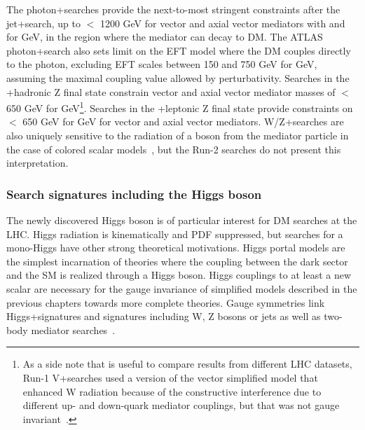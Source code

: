 The photon+\MET searches provide the next-to-most stringent constraints after the jet+\MET search, 
up to \mmed $<$ 1200 GeV for vector and axial vector mediators with  and  for  GeV,
in the region where the mediator can decay to DM. %
The ATLAS photon+\MET search also sets limit on the EFT model where the DM couples directly to the photon, 
excluding EFT scales between 150 and 750 GeV for  GeV, assuming the maximal coupling value allowed by perturbativity. 
Searches in the \MET+hadronic Z final state constrain vector and axial vector mediator
masses of \mmed $<$ 650 GeV for  GeV\footnote{As a side note that is useful to compare results from different LHC datasets, 
Run-1 V+\MET searches used a version of the vector simplified model
that enhanced W radiation because of the constructive interference 
due to different up- and down-quark mediator couplings,
but that was not gauge invariant~\cite{Bell:2015sza,1475-7516-2016-01-051}.}. 
Searches in the \MET+leptonic Z final state provide constraints on 
\mmed $<$ 650 GeV for  GeV for vector and axial vector mediators. 
W/Z+\MET searches are also uniquely sensitive to the radiation of a boson 
from the mediator particle in the case of colored scalar models~\cite{Bell:2012rg}, 
but the Run-2 searches do not present this interpretation. 

\subsubsection{Search signatures including the Higgs boson}

The newly discovered Higgs boson is of particular interest for DM searches at the LHC. 
Higgs radiation is kinematically and PDF suppressed, but searches for a mono-Higgs have
other strong theoretical motivations. 
Higgs portal models are the simplest incarnation of theories where the coupling
between the dark sector and the SM is realized through a Higgs boson. Higgs couplings
to at least a new scalar are necessary for the gauge invariance of simplified models described in
the previous chapters towards more complete theories. 
Gauge symmetries link Higgs+\MET signatures and signatures including W, Z bosons
or jets as well as two-body mediator searches~\cite{Liew:2016oon}. 

